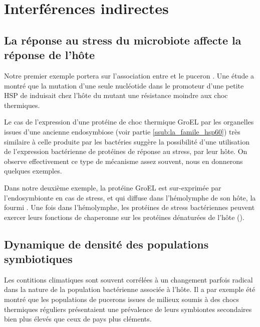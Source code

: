 	\section{Interférences indirectes} %
	 	\label{sec:indirect}

\subsection{La réponse au stress du microbiote affecte la réponse de l'hôte} %
\label{sub:groel}


Notre premier exemple portera sur l'association entre  et le
puceron . Une étude \cite{dunbar2007} a montré que la mutation d'une seule nucléotide dans le promoteur d'une petite HSP de  induisait
chez l'hôte du mutant une résistance moindre aux choc thermiques.

Le cas de l'expression d'une protéine de choc thermique GroEL par les
organelles issues d'une ancienne endosymbiose (voir partie
\ref{ssub:la_famile_hsp60}) très similaire à celle produite par les bactéries
suggère la possibilité d'une utilisation de l'expression bactérienne de
protéines de réponse au stress, par leur hôte. On observe effectivement ce
type de mécanisme assez souvent, nous en donnerons quelques exemples.


Dans notre deuxième exemple, la protéine GroEL est sur-exprimée par
l'endosymbionte  en cas de stress, et qui diffuse
dans l'hémolymphe de son hôte, la fourmi .
Une fois dans l'hémolymphe, les protéines de stress bactériennes peuvent
exercer leurs fonctions de chaperonne sur les protéines dénaturées de l'hôte
(\cite{stoll2009}). 





\subsection{Dynamique de densité des populations symbiotiques} %
\label{sub:taillepop}

Les contitions climatiques sont souvent corrélées à un changement parfois
radical dans la nature de la population bactérienne associée à l'hôte. Il a
par exemple été montré \cite{harmon2009} que les populations de pucerons
issues de milieux soumis à des chocs thermiques réguliers présentaient une
prévalence de leurs symbiontes secondaires bien plus élevés que ceux de pays
plus cléments.


